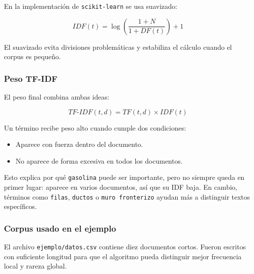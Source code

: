 \documentclass[
  spanish,
  letterpaper,
  DIV=11,
  numbers=noendperiod]{scrartcl}
\providecommand{\tightlist}{%
  \setlength{\itemsep}{0pt}\setlength{\parskip}{0pt}}
\begin{document}
En la implementación de \texttt{scikit-learn} se usa suavizado:

\[IDF(t) = \log\left(\frac{1 + N}{1 + DF(t)}\right) + 1\]

El suavizado evita divisiones problemáticas y estabiliza el cálculo
cuando el corpus es pequeño.

\subsubsection{Peso TF-IDF}\label{peso-tf-idf}

El peso final combina ambas ideas:

\[TF\text{-}IDF(t,d) = TF(t,d) \times IDF(t)\]

Un término recibe peso alto cuando cumple dos condiciones:

\begin{itemize}
\tightlist
\item
  Aparece con fuerza dentro del documento.
\item
  No aparece de forma excesiva en todos los documentos.
\end{itemize}

Esto explica por qué \texttt{gasolina} puede ser importante, pero no
siempre queda en primer lugar: aparece en varios documentos, así que su
IDF baja. En cambio, términos como \texttt{filas}, \texttt{ductos} o
\texttt{muro\ fronterizo} ayudan más a distinguir textos específicos.

\subsubsection{Corpus usado en el
ejemplo}\label{corpus-usado-en-el-ejemplo}

El archivo \texttt{ejemplo/datos.csv} contiene diez documentos cortos.
Fueron escritos con suficiente longitud para que el algoritmo pueda
distinguir mejor frecuencia local y rareza global.
\end{document}
